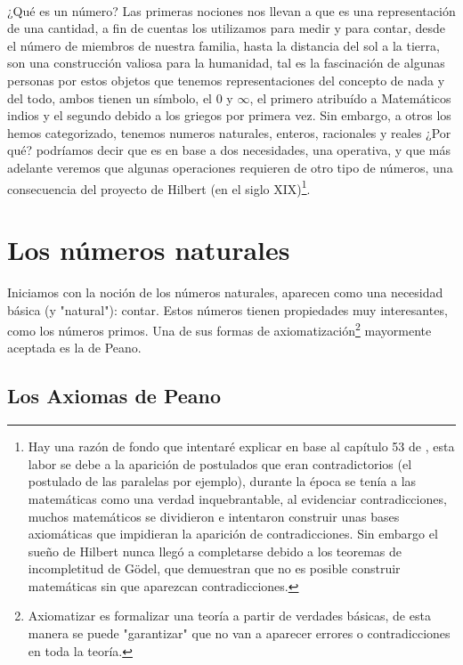 \documentclass{article}
\begin{document}
\paragraph{} ¿Qué es un número? Las primeras nociones nos llevan a que es una representación de una cantidad, a fin de cuentas los utilizamos para medir y para contar, desde el número de miembros de nuestra familia, hasta la distancia del sol a la tierra, son una construcción valiosa para la humanidad, tal es la fascinación de algunas personas por estos objetos que tenemos representaciones del concepto de nada y del todo, ambos tienen un símbolo, el 0 y $\infty$, el primero atribuído a Matemáticos indios y el segundo debido a los griegos por primera vez. Sin embargo, a otros los hemos categorizado, tenemos numeros naturales, enteros, racionales y reales ¿Por qué? podríamos decir que es en base a dos necesidades, una operativa, y que más adelante veremos que algunas operaciones requieren de otro tipo de números, una consecuencia del proyecto de Hilbert (en el siglo XIX)\footnote{Hay una razón de fondo que intentaré explicar en base al capítulo 53 de \cite{morris_kline_pensamiento_1972}, esta labor se debe a la aparición de postulados que eran contradictorios (el postulado de las paralelas por ejemplo), durante la época se tenía a las matemáticas como una verdad inquebrantable, al evidenciar contradicciones, muchos matemáticos se dividieron e intentaron construir unas bases axiomáticas que impidieran la aparición de contradicciones. Sin embargo el sueño de Hilbert nunca llegó a completarse debido a los teoremas de incompletitud de Gödel, que demuestran que no es posible construir matemáticas sin que aparezcan contradicciones.
}.

\section{Los números naturales}
Iniciamos con la noción de los números naturales, aparecen como una necesidad básica (y "natural"): contar. Estos números tienen propiedades muy interesantes, como los números primos. Una de sus formas de axiomatización\footnote{Axiomatizar es formalizar una teoría a partir de verdades básicas, de esta manera se puede "garantizar" que no van a aparecer errores o contradicciones en toda la teoría.} mayormente aceptada es la de Peano.

\subsection{Los Axiomas de Peano}
\end{document}

